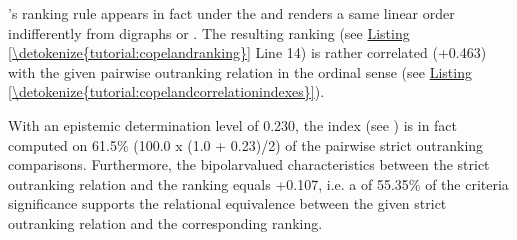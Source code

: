 \documentclass[a4paper,12pt,english]{sphinxhowto}
\begin{document}
’s ranking rule appears in fact  under the {\hyperref[\detokenize{tutorial:codual-transform-label}]{}} and renders a same linear order indifferently from digraphs  or  . The resulting ranking (see \hyperref[\detokenize{tutorial:copelandranking}]{Listing \ref{\detokenize{tutorial:copelandranking}}} Line 14) is rather correlated (+0.463) with the given pairwise outranking relation in the ordinal  sense (see \hyperref[\detokenize{tutorial:copelandcorrelationindexes}]{Listing \ref{\detokenize{tutorial:copelandcorrelationindexes}}}).
\def\sphinxLiteralBlockLabel{\label{\detokenize{tutorial:copelandcorrelationindexes}}}
\begin{sphinxVerbatim}[commandchars=\\\{\},numbers=left,firstnumber=1,stepnumber=1]
  
\end{sphinxVerbatim}

With an epistemic determination level of 0.230, the  index (see ) is in fact computed on 61.5\% (100.0 x (1.0 + 0.23)/2) of the pairwise strict outranking comparisons. Furthermore, the bipolar\sphinxhyphen{}valued  characteristics between the strict outranking relation and the  ranking equals +0.107, i.e. a  of 55.35\% of the criteria significance supports the relational equivalence between the given strict outranking relation and the corresponding  ranking.
\end{document}
